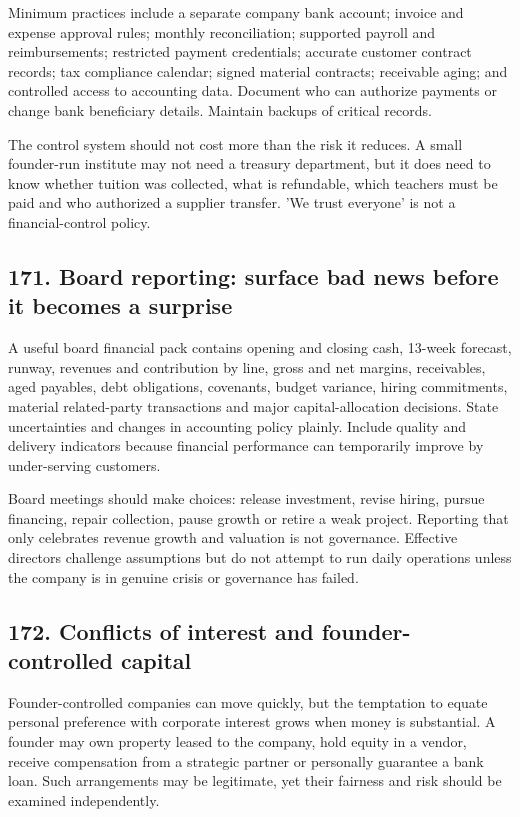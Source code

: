 Minimum practices include a separate company bank account; invoice and expense approval rules; monthly reconciliation; supported payroll and reimbursements; restricted payment credentials; accurate customer contract records; tax compliance calendar; signed material contracts; receivable aging; and controlled access to accounting data. Document who can authorize payments or change bank beneficiary details. Maintain backups of critical records.

The control system should not cost more than the risk it reduces. A small founder-run institute may not need a treasury department, but it does need to know whether tuition was collected, what is refundable, which teachers must be paid and who authorized a supplier transfer. 'We trust everyone' is not a financial-control policy.

\subsection{171. Board reporting: surface bad news before it becomes a surprise}


A useful board financial pack contains opening and closing cash, 13-week forecast, runway, revenues and contribution by line, gross and net margins, receivables, aged payables, debt obligations, covenants, budget variance, hiring commitments, material related-party transactions and major capital-allocation decisions. State uncertainties and changes in accounting policy plainly. Include quality and delivery indicators because financial performance can temporarily improve by under-serving customers.

Board meetings should make choices: release investment, revise hiring, pursue financing, repair collection, pause growth or retire a weak project. Reporting that only celebrates revenue growth and valuation is not governance. Effective directors challenge assumptions but do not attempt to run daily operations unless the company is in genuine crisis or governance has failed.

\subsection{172. Conflicts of interest and founder-controlled capital}


Founder-controlled companies can move quickly, but the temptation to equate personal preference with corporate interest grows when money is substantial. A founder may own property leased to the company, hold equity in a vendor, receive compensation from a strategic partner or personally guarantee a bank loan. Such arrangements may be legitimate, yet their fairness and risk should be examined independently.

